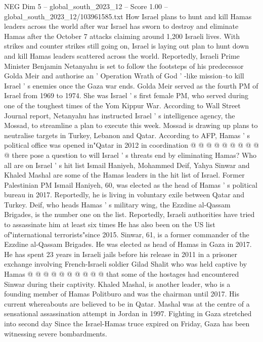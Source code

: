 \begin{textsample}{NEG Dim 5 – global\_south\_2023\_12 – Score 1.00 – global\_south\_2023\_12/103961585.txt}  \label{ex:f5_neg_357}
How Israel plans to hunt and kill Hamas leaders across the world after war Israel has sworn to destroy and eliminate Hamas after the October 7 attacks claiming around 1,200 Israeli lives.
With strikes and counter strikes still going on, Israel is laying out plan to hunt down and kill Hamas leaders scattered across the world.
Reportedly, Israeli Prime Minister Benjamin Netanyahu is set to follow the footsteps of his predecessor Golda Meir and authorise an ' Operation Wrath of God ' -like mission--to kill Israel ' s enemies once the Gaza war ends.
Golda Meir served as the fourth PM of Israel from 1969 to 1974.
She was Israel ' s first female PM, who served during one of the toughest times of the Yom Kippur War.
According to Wall Street Journal report, Netanyahu has instructed Israel ' s intelligence agency, the Mossad, to streamline a plan to execute this week.
Mossad is drawing up plans to neutralise targets in Turkey, Lebanon and Qatar.
According to AFP, Hamas ' s political office was opened in"Qatar in 2012 in coordination @ @ @ @ @ @ @ @ @ @ there pose a question to will Israel ' s threats end by eliminating Hamas?
Who all are on Israel ' s hit list Ismail Haniyeh, Mohammed Deif, Yahya Sinwar and Khaled Mashal are some of the Hamas leaders in the hit list of Israel.
Former Palestinian PM Ismail Haniyeh, 60, was elected as the head of Hamas ' s political bureau in 2017.
Reportedly, he is living in voluntary exile between Qatar and Turkey.
Deif, who heads Hamas ' s military wing, the Ezzdine al-Qassam Brigades, is the number one on the list.
Reportedly, Israeli authorities have tried to assassinate him at least six times He has also been on the US list of"international terrorists"since 2015.
Sinwar, 61, is a former commander of the Ezzdine al-Qassam Brigades.
He was elected as head of Hamas in Gaza in 2017.
He has spent 23 years in Israeli jails before his release in 2011 in a prisoner exchange involving French-Israeli soldier Gilad Shalit who was held captive by Hamas @ @ @ @ @ @ @ @ @ @ that some of the hostages had encountered Sinwar during their captivity.
Khaled Mashal, is another leader, who is a founding member of Hamas Politburo and was the chairman until 2017.
His current whereabouts are believed to be in Qatar.
Mashal was at the centre of a sensational assassination attempt in Jordan in 1997.
Fighting in Gaza stretched into second day Since the Israel-Hamas truce expired on Friday, Gaza has been witnessing severe bombardments.

\end{textsample}
